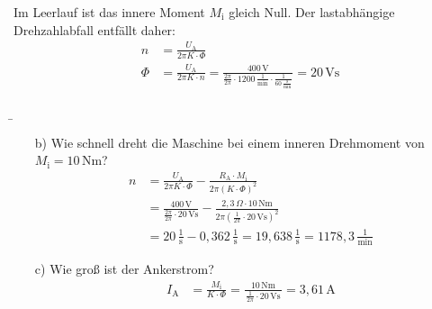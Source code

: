 \begin{frame}
{\begin{itemize}
				Im Leerlauf ist das innere Moment $M_\mathrm{i}$ gleich Null. Der lastabhängige Drehzahlabfall entfällt daher:
				\begin{align*}
					n&=\frac{U_\mathrm{A}}{2\pi K\cdot \varPhi}\\
					\varPhi&=\frac{U_\mathrm{A}}{2\pi K\cdot n} = \frac{400\,\text{V}}{\frac{2\pi}{2\pi}\cdot 1200 \,\frac{1}{\text{min}}\cdot \frac{1}{60\,\frac{\text{s}}{\text{min}}}}  = 20\,\text{Vs}
				\end{align*}
		\end{itemize}	
	}
\end{frame}
\b{
	\begin{frame}
		\begin{itemize}
			\item[b)] Wie schnell dreht die Maschine bei einem inneren Drehmoment von $M_\mathrm{i}=10\,\text{Nm}$?\pause
				\begin{align*}
					n &= \frac{U_\mathrm{A}}{2\pi K\cdot \varPhi} - \frac{R_\mathrm{A}\cdot M_\mathrm{i}}{2\pi(K\cdot \varPhi)^2}\\
					&= \frac{400\,\text{V}}{\frac{2\pi}{2\pi}\cdot 20\,\text{Vs}} - \frac{2,3\,\Omega \cdot 10\,\text{Nm}}{2\pi(\frac{1}{2\pi}\cdot 20\,\text{Vs})^2}\\
					&= 20\,\frac{1}{\text{s}} - 0,362 \,\frac{1}{\text{s}} = 19,638\,\frac{1}{\text{s}} =  1178,3\,\frac{1}{\text{min}}
				\end{align*}\pause
			\item[c)] Wie groß ist der Ankerstrom?
				\begin{align*}
				I_\mathrm{A} &= \frac{M_\mathrm{i}}{K\cdot \varPhi} = \frac{10\,\text{Nm}}{\,\frac{1}{2\pi}\cdot 20\,\text{Vs}\,} = 3,61\,\text{A}
				\end{align*}
		\end{itemize}	
	\end{frame}
}




